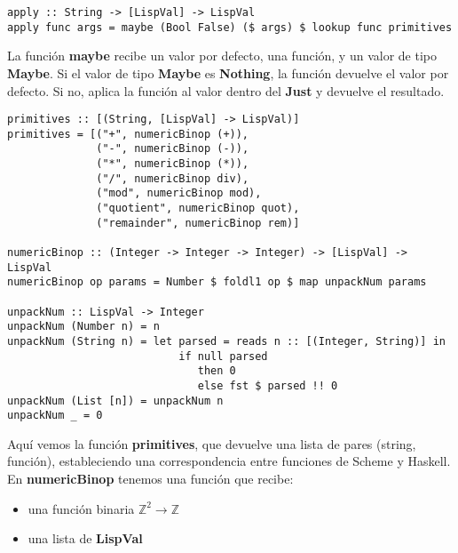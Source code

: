 \begin{minipage}{\linewidth}
\begin{footnotesize}
\begin{lstlisting}[frame=single]
apply :: String -> [LispVal] -> LispVal
apply func args = maybe (Bool False) ($ args) $ lookup func primitives
\end{lstlisting}
\end{footnotesize}
\end{minipage}

La funci\'on \textbf{maybe} recibe un valor por defecto, una funci\'on, y un valor de tipo \textbf{Maybe}. Si el valor de tipo \textbf{Maybe} es \textbf{Nothing}, la funci\'on devuelve el valor por defecto. Si no, aplica la funci\'on al valor dentro del \textbf{Just} y devuelve el resultado.\\

\begin{minipage}{\linewidth}
\begin{footnotesize}
\begin{lstlisting}[frame=single]
primitives :: [(String, [LispVal] -> LispVal)]
primitives = [("+", numericBinop (+)),
              ("-", numericBinop (-)),
              ("*", numericBinop (*)),
              ("/", numericBinop div),
              ("mod", numericBinop mod),
              ("quotient", numericBinop quot),
              ("remainder", numericBinop rem)]

numericBinop :: (Integer -> Integer -> Integer) -> [LispVal] -> LispVal
numericBinop op params = Number $ foldl1 op $ map unpackNum params
 
unpackNum :: LispVal -> Integer
unpackNum (Number n) = n
unpackNum (String n) = let parsed = reads n :: [(Integer, String)] in 
                           if null parsed 
                              then 0
                              else fst $ parsed !! 0
unpackNum (List [n]) = unpackNum n
unpackNum _ = 0
\end{lstlisting}
\end{footnotesize}
\end{minipage}

Aqu\'i vemos la funci\'on \textbf{primitives}, que devuelve una lista de pares (string, funci\'on), estableciendo una correspondencia entre funciones de Scheme y Haskell. En \textbf{numericBinop} tenemos una funci\'on que recibe:

\begin{itemize}
  \item una funci\'on binaria $\mathbb{Z}^2 \rightarrow \mathbb{Z}$
  \item una lista de \textbf{LispVal}
\end{itemize}

